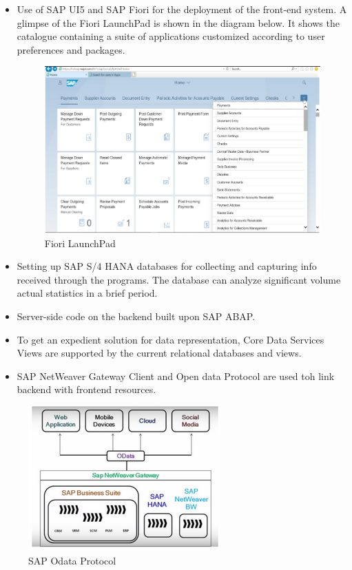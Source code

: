     \begin{itemize}
    \item Use of SAP UI5 and SAP Fiori for the deployment of the front-end system. A glimpse
     of the Fiori LaunchPad is shown in the diagram below. It shows the catalogue
     containing a suite of applications customized according to user preferences and
     packages.
     
    \begin{figure}[H]
        \centering
            \includegraphics[scale=0.5]{Chapter1/Figures/fiori1.png}	
            \caption{Fiori LaunchPad} 
            \label{fig:fiorilaunchpad}
    \end{figure}
        
    \item Setting up SAP S/4 HANA databases for collecting and capturing info received
        through the programs. The database can analyze significant volume actual statistics
        in a brief period.
    \item Server-side code on the backend built upon SAP ABAP.
    \item  To get an expedient solution for data representation, Core Data Services Views are
        supported by the current relational databases and views.
    \item  SAP NetWeaver Gateway Client and Open data Protocol are used toh link
        backend with frontend resources.
    \end{itemize}
    
        \begin{figure}[H]
            \centering
                \includegraphics[scale=0.5]{Chapter1/Figures/odata.png}	
                \caption{SAP Odata Protocol} 
                \label{fig:odataprotocol}
        \end{figure}
            
